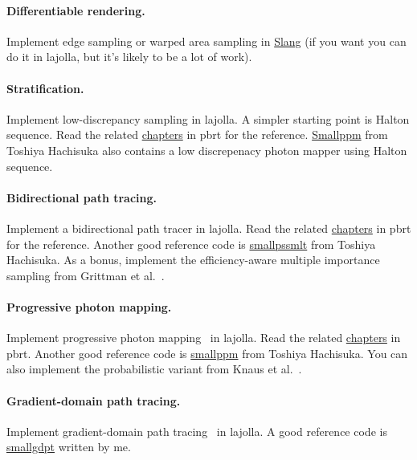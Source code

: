 \paragraph{Differentiable rendering.}
Implement edge sampling or warped area sampling in \href{https://developer.nvidia.com/blog/differentiable-slang-example-applications/}{Slang} (if you want you can do it in lajolla, but it's likely to be a lot of work). 

\paragraph{Stratification.}
Implement low-discrepancy sampling in lajolla.
A simpler starting point is Halton sequence.
Read the related \href{https://www.pbr-book.org/3ed-2018/Sampling_and_Reconstruction/The_Halton_Sampler}{chapters} in pbrt for the reference.
\href{https://cs.uwaterloo.ca/~thachisu/smallppm_exp.cpp}{Smallppm} from Toshiya Hachisuka also contains a low discrepenacy photon mapper using Halton sequence.

\paragraph{Bidirectional path tracing.}
Implement a bidirectional path tracer in lajolla.
Read the related \href{https://www.pbr-book.org/3ed-2018/Light_Transport_III_Bidirectional_Methods/Bidirectional_Path_Tracing}{chapters} in pbrt for the reference.
Another good reference code is \href{https://cs.uwaterloo.ca/~thachisu/smallpssmlt.cpp}{smallpssmlt} from Toshiya Hachisuka.
As a bonus, implement the efficiency-aware multiple importance sampling from Grittman et al.~\cite{Grittmann:2022:EMI}.

\paragraph{Progressive photon mapping.}
Implement progressive photon mapping~\cite{Hachisuka:2008:PPM} in lajolla.
Read the related \href{https://www.pbr-book.org/3ed-2018/Light_Transport_III_Bidirectional_Methods/Stochastic_Progressive_Photon_Mapping}{chapters} in pbrt.
Another good reference code is \href{https://cs.uwaterloo.ca/~thachisu/smallppm_exp.cpp}{smallppm} from Toshiya Hachisuka.
You can also implement the probabilistic variant from Knaus et al.~\cite{Knaus:2011:PPM}.

\paragraph{Gradient-domain path tracing.} 
Implement gradient-domain path tracing~\cite{Kettunen:2015:GPT} in lajolla.
A good reference code is \href{https://gist.github.com/BachiLi/4f5c6e5a4fef5773dab1}{smallgdpt} written by me.

